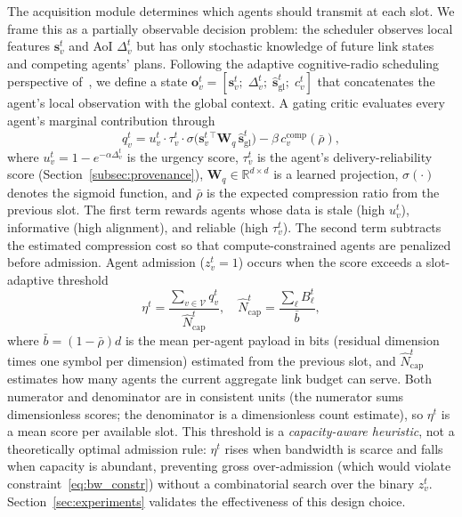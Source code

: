 \documentclass[final,3p,times,review,sort&compress]{elsarticle}
\begin{document}
The acquisition module determines which agents should transmit at each slot. We frame this as a partially observable decision problem: the scheduler observes local features $\mathbf{s}_v^t$ and AoI $\Delta_v^t$ but has only stochastic knowledge of future link states and competing agents’ plans. Following the adaptive cognitive-radio scheduling perspective of~\cite{JEON20123318}, we define a state $\mathbf{o}_v^t = [\mathbf{s}_v^t;\;\Delta_v^t;\;\hat{\mathbf{s}}_{\mathrm{gl}}^t;\;c_v^t]$ that concatenates the agent’s local observation with the global context. A gating critic evaluates every agent’s marginal contribution through
\begin{equation}
q_v^t = u_v^t \cdot \tau_v^t \cdot \sigma\!\bigl(\mathbf{s}_v^t{}^\top \mathbf{W}_q\,\hat{\mathbf{s}}_{\mathrm{gl}}^t\bigr) - \beta\,c_v^{\mathrm{comp}}(\bar{\rho}),
\label{eq:qvalue}
\end{equation}
where $u_v^t = 1 - e^{-\alpha\Delta_v^t}$ is the urgency score, $\tau_v^t$ is the agent’s delivery-reliability score (Section~\ref{subsec:provenance}), $\mathbf{W}_q\in\mathbb{R}^{d\times d}$ is a learned projection, $\sigma(\cdot)$ denotes the sigmoid function, and $\bar{\rho}$ is the expected compression ratio from the previous slot. The first term rewards agents whose data is stale (high $u_v^t$), informative (high alignment), and reliable (high $\tau_v^t$). The second term subtracts the estimated compression cost so that compute-constrained agents are penalized before admission. Agent admission ($z_v^t=1$) occurs when the score exceeds a slot-adaptive threshold
\begin{equation}
\eta^t = \frac{\sum_{v\in\mathcal{V}} q_v^t}{\hat{N}_{\mathrm{cap}}^t}, \quad \hat{N}_{\mathrm{cap}}^t = \frac{\sum_\ell B_\ell^t}{\bar{b}},
\label{eq:threshold}
\end{equation}
where $\bar{b}=(1-\bar{\rho})d$ is the mean per-agent payload in bits (residual dimension times one symbol per dimension) estimated from the previous slot, and $\hat{N}_{\mathrm{cap}}^t$ estimates how many agents the current aggregate link budget can serve. Both numerator and denominator are in consistent units (the numerator sums dimensionless scores; the denominator is a dimensionless count estimate), so $\eta^t$ is a mean score per available slot. This threshold is a \emph{capacity-aware heuristic}, not a theoretically optimal admission rule: $\eta^t$ rises when bandwidth is scarce and falls when capacity is abundant, preventing gross over-admission (which would violate constraint~\eqref{eq:bw_constr}) without a combinatorial search over the binary $z_v^t$. Section~\ref{sec:experiments} validates the effectiveness of this design choice.
\end{document}
